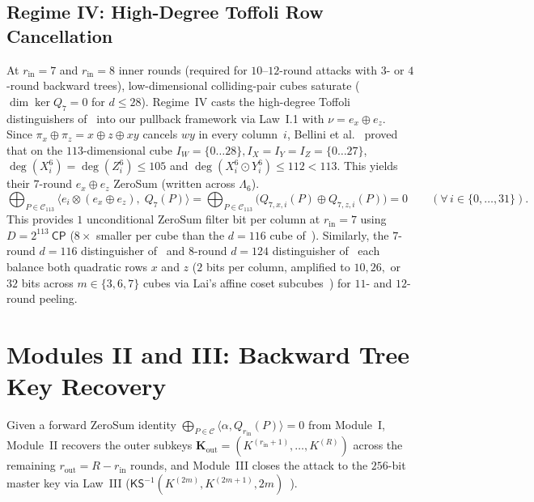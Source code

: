 \documentclass[11pt,a4paper]{article}
\theoremstyle{definition}
\theoremstyle{remark}
\newcommand{\CP}{\mathsf{CP}}
\begin{document}
\subsection{Regime IV: High-Degree Toffoli Row Cancellation}
\label{subsec:regime4}

At $r_{\text{in}} = 7$ and $r_{\text{in}} = 8$ inner rounds (required for $10$--$12$-round attacks with $3$- or $4$-round backward trees), low-dimensional colliding-pair cubes saturate ($\dim \ker Q_7 = 0$ for $d \le 28$). Regime~IV casts the high-degree Toffoli distinguishers of~\cite{BRRT25,KKL24,DG25} into our pullback framework via Law~I.1 with $\nu = e_x \oplus e_z$. Since $\pi_x \oplus \pi_z = x \oplus z \oplus xy$ cancels $wy$ in every column~$i$, Bellini et al.~\cite[Theorem~1 and Table~4, $r = 6$]{BRRT25} proved that on the $113$-dimensional cube $I_W = \{0\dots 28\}, I_X = I_Y = I_Z = \{0\dots 27\}$, $\deg(X^6_i) = \deg(Z^6_i) \le 105$ and $\deg(X^6_i \odot Y^6_i) \le 112 < 113$. This yields their $7$-round $e_x \oplus e_z$ ZeroSum (written across $\Lambda_6$).
\[
\bigoplus_{P \in \mathcal{C}_{113}} \bigl\langle e_i \otimes (e_x \oplus e_z),\; Q_7(P) \bigr\rangle
= \bigoplus_{P \in \mathcal{C}_{113}} \bigl(Q_{7,x,i}(P) \oplus Q_{7,z,i}(P)\bigr) = 0 \qquad (\forall\, i \in \{0,\dots,31\}).
\]
This provides $1$ unconditional ZeroSum filter bit per column at $r_{\text{in}} = 7$ using $D = 2^{113}~\CP$ ($8\times$ smaller per cube than the $d = 116$ cube of~\cite[$\S$3.2]{DG25}). Similarly, the $7$-round $d = 116$ distinguisher of~\cite[$\S$3.2, $\S$3.4]{DG25} and $8$-round $d = 124$ distinguisher of~\cite{BRRT25,KKL24,DG25} each balance both quadratic rows $x$ and $z$ ($2$ bits per column, amplified to $10, 26,$ or $32$ bits across $m \in \{3, 6, 7\}$ cubes via Lai's affine coset subcubes~\cite{Lai94,DG25}) for $11$- and $12$-round peeling.

\section{Modules II and III: Backward Tree Key Recovery}
\label{sec:backward-engine}
\label{sec:higher-rounds}

Given a forward ZeroSum identity $\bigoplus_{P \in \mathcal{C}} \langle \alpha, Q_{r_{\text{in}}}(P)\rangle = 0$ from Module~I, Module~II recovers the outer subkeys $\mathbf{K}_{\text{out}} = (K^{(r_{\text{in}}+1)}, \dots, K^{(R)})$ across the remaining $r_{\text{out}} = R - r_{\text{in}}$ rounds, and Module~III closes the attack to the $256$-bit master key via Law~III ($\mathsf{KS}^{-1}(K^{(2m)}, K^{(2m+1)}, 2m)$~\cite[Remark~5]{DG25}).
\end{document}
